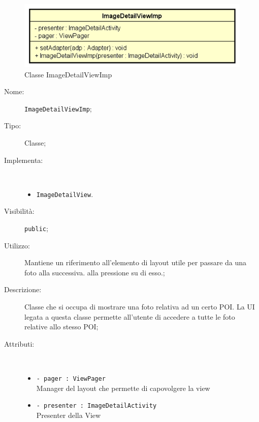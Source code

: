 \documentclass[../DefinizioneDiProdotto.tex]{subfiles}
\begin{document}
    \begin{figure}[H]
        \centering
        \includegraphics{img/ImageDetailViewImp.png}
        \caption{Classe ImageDetailViewImp}\label{fig:view::ImageDetailViewImp} 
    \end{figure}
    \begin{description}
\item[Nome:] \texttt{ImageDetailViewImp};
\item[Tipo:] Classe;
\item[Implementa:] \
\begin{itemize}
\item \texttt{ImageDetailView}.

\end{itemize}
\item[Visibilità:] \texttt{public};
\item[Utilizzo:] Mantiene un riferimento all'elemento di layout utile per passare da una foto alla successiva. alla pressione su di esso.;
\item[Descrizione:] Classe che si occupa di mostrare una foto relativa ad un certo POI. La UI legata a questa classe permette all'utente di accedere a tutte le foto relative allo stesso POI;
\item[Attributi:] \
\begin{itemize}
\item \texttt{- pager : ViewPager}\\
Manager del layout che permette di capovolgere la view

\item \texttt{- presenter : ImageDetailActivity}\\
Presenter della View


\end{itemize}
\end{description}
\end{document}
